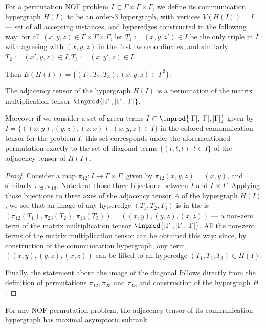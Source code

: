 \begin{definition}
\label{def:communication-hypergraph}
For a permutation NOF problem $I \subset \Gamma \times \Gamma \times \Gamma$, we define its communication hypergraph $H(I)$ to be an order-3 hypergraph, with vertices $V(H(I)) = I$ --- set of all accepting instances, and hyperedges constructed in the following way: for all $(x,y,z) \in \Gamma \times \Gamma \times \Gamma$, let $T_1 := (x, y, z') \in I$ be the only triple in $I$ with agreeing with $(x,y,z)$ in the first two coordinates, and similarly $T_2 := (x',y,z) \in I, T_3 := (x, y', z) \in I$.

Then $E(H(I)) = \{ (T_1, T_2, T_3) : (x,y,z) \in \Gamma^3 \}$.
\end{definition}

\begin{fact}
The adjacency tensor of the hypergraph $H(I)$ is a permutation of the matrix multiplication tensor $\inprod{|\Gamma|, |\Gamma|, |\Gamma|}$. 

Moreover if we consider a set of green terms $\tilde{I} \subset \inprod{|\Gamma|, |\Gamma|, |\Gamma|}$ given by $\tilde{I} = \{((x,y), (y,z), (z,x)) : (x,y,z) \in I\}$ in the colored communication tensor for the problem $I$, this set 
 corresponds under the aforementioned permutation exactly to the set of diagonal terms $\{(t,t,t) : t \in I\}$ of the adjacency tensor of $H(I)$.
\end{fact}
\begin{proof}
Consider a map $\pi_{12} : I \to \Gamma \times \Gamma$, given by $\pi_{12}(x,y,z) = (x,y)$, and similarly $\pi_{23}, \pi_{13}$. Note that those three bijections between $I$ and $\Gamma \times \Gamma$. Applying those bijections to three axes of the adjacency tensor $A$ of the hypergraph $H(I)$, we see that an image of any hyperedge $(T_1, T_2, T_3)$ is in the  is $(\pi_{12}(T_1), \pi_{23}(T_2), \pi_{13}(T_3)) = ( (x,y), (y,z), (x,z) )$ --- a non-zero term of the matrix multiplication tensor $\inprod{|\Gamma|, |\Gamma|, |\Gamma|}$. All the non-zero terms of the matrix multiplication tensor can be obtained this way: since, by construction of the communication hypergraph, any term $( (x,y), (y,z), (x,z))$ can be lifted to an hyperedge $(T_1, T_2, T_3) \in H(I).$

Finally, the statement about the image of the diagonal follows directly from the definition of permutations $\pi_{12}, \pi_{23}$ and $\pi_{13}$ and construction of the hypergraph $H$.
\end{proof}
\begin{corollary}
    For any NOF permutation problem, the adjacency tensor of its communication hypergraph has maximal asymptotic subrank.
\end{corollary}

